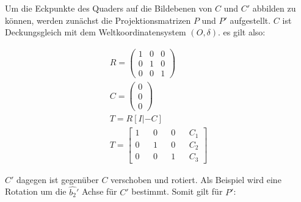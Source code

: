%
Um die Eckpunkte des Quaders auf die Bildebenen von $C$ und $C'$ abbilden zu können, werden zunächst die Projektionsmatrizen $P$ und $P'$ aufgestellt. $C$ ist Deckungsgleich mit dem Weltkoordinatensystem $(O,\delta)$. es gilt also:

\begin{gather}
R=\begin{pmatrix}
1&0&0\\
0&1&0\\
0&0&1
\end{pmatrix}\\
C=\begin{pmatrix}
0\\0\\0
\end{pmatrix}\\
T = R[I|-C]\\
T = \begin{bmatrix}
1&&0&&0&&C_1\\
0&&1&&0&&C_2\\
0&&0&&1&&C_3
\end{bmatrix}
\end{gather} 

$C'$ dagegen ist gegenüber $C$ verschoben und rotiert. Als Beispiel wird eine Rotation um die $\hat{b_2}'$ Achse für $C'$ bestimmt. Somit gilt für $P'$:









